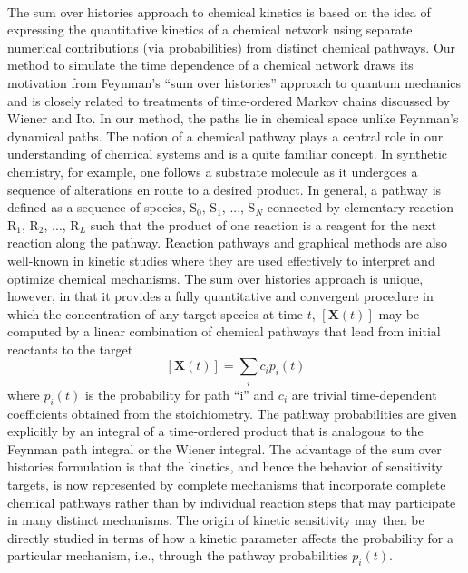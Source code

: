 \paragraph{}
The sum over histories approach to chemical kinetics is
based on the idea of expressing the quantitative kinetics of a
chemical network using separate numerical contributions (via
probabilities) from distinct chemical pathways. Our method to
simulate the time dependence of a chemical network draws its
motivation from Feynman’s “sum over histories” approach to
quantum mechanics\cite{ch4_26_feynman2010quantum} and is closely related to treatments of
time-ordered Markov chains\cite{ch1_IRPC_33_van1992stochastic} discussed by Wiener\cite{ch3_9_gardiner1985handbook} and Ito.\cite{ch3_10_ito1961wiener}
In our method, the paths lie in chemical space unlike
Feynman’s dynamical paths. The notion of a chemical pathway
plays a central role in our understanding of chemical systems
and is a quite familiar concept. In synthetic chemistry, for
example, one follows a substrate molecule as it undergoes a
sequence of alterations en route to a desired product. In
general, a pathway is defined as a sequence of species, S$_0$, S$_1$, ...,
S$_N$ connected by elementary reaction R$_1$, R$_2$, ..., R$_L$ such that the
product of one reaction is a reagent for the next reaction along
the pathway. Reaction pathways and graphical methods are also
well-known in kinetic studies where they are used effectively to
interpret and optimize chemical mechanisms.\cite{ch3_11_temkin1996chemical,ch1_IRPC_22_chern1990effective,ch1_IRPC_31_lu2005directed,ch1_IRPC_20_lehmann2004algorithm,ch1_IRPC_19_he2008graph,ch1_IRPC_21_feng2010dominant,ch3_17_kee2008chemkin} The sum over histories approach is unique, however, in that it provides a
fully quantitative and convergent procedure in which the
concentration of any target species at time $t$, $\left[ \textbf{X}(t)\right]$ may be
computed by a linear combination of chemical pathways that
lead from initial reactants to the target
\begin{equation}
\label{ch3:eqn1}
\left[ \textbf{X}(t) \right] = \sum_{i} {c_ip_i(t)}
\end{equation}
where $p_i(t)$ is the probability for path “i” and $c_i$ are trivial time-dependent
coefficients obtained from the stoichiometry. The
pathway probabilities are given explicitly by an integral of a
time-ordered product that is analogous to the Feynman path
integral or the Wiener integral. The advantage of the sum over
histories formulation is that the kinetics, and hence the
behavior of sensitivity targets, is now represented by complete
mechanisms that incorporate complete chemical pathways
rather than by individual reaction steps that may participate in
many distinct mechanisms. The origin of kinetic sensitivity may
then be directly studied in terms of how a kinetic parameter
affects the probability for a particular mechanism, i.e., through
the pathway probabilities $p_i(t)$.
\newline
